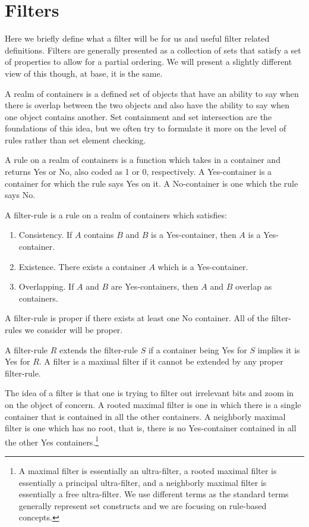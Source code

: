 \documentclass[12pt]{article}
\begin{document}
\section{Filters}

Here we briefly define what a filter will be for us and useful filter related definitions. Filters are generally presented as a collection of sets that satisfy a set of properties to allow for a partial ordering. We will present a slightly different view of this though, at base, it is the same. 

A realm of containers is a defined set of objects that have an ability to say when there is overlap between the two objects and also have the ability to say when one object contains another. Set containment and set intersection are the foundations of this idea, but we often try to formulate it more on the level of rules rather than set element checking. 

A rule on a realm of containers is a function which takes in a container and returns Yes or No, also coded as 1 or 0, respectively. A Yes-container is a container for which the rule says Yes on it. A No-container is one which the rule says No.

A filter-rule is a rule on a realm of containers which satisfies:

\begin{enumerate}
    \item Consistency. If $A$ contains $B$ and $B$ is a Yes-container, then $A$ is a Yes-container. 
    \item Existence. There exists a container $A$ which is a Yes-container. 
    \item Overlapping. If $A$ and $B$ are Yes-containers, then $A$ and $B$ overlap as containers. 
\end{enumerate}

A filter-rule is proper if there exists at least one No container. All of the filter-rules we consider will be proper. 

A filter-rule $R$ extends the filter-rule $S$ if a container being Yes for $S$ implies it is Yes for $R$. A filter is a maximal filter if it cannot be extended by any proper filter-rule. 

The idea of a filter is that one is trying to filter out irrelevant bits and zoom in on the object of concern. A rooted maximal filter is one in which there is a single container that is contained in all the other containers. A neighborly maximal filter is one which has no root, that is, there is no Yes-container contained in all the other Yes containers.\footnote{A maximal filter is essentially an ultra-filter, a rooted maximal filter is essentially a principal ultra-filter, and a neighborly maximal filter is essentially a free ultra-filter. We use different terms as the standard terms generally represent set constructs and we are focusing on rule-based concepts.  }
\end{document}
